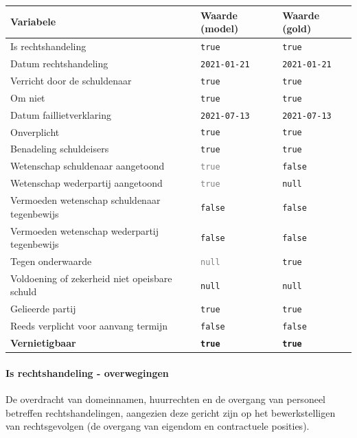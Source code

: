 \documentclass[
  dutch,
  a4paper,
]{article}
\begin{document}
\begin{center}
\small
\begin{tabular}{@{}p{7.4cm}p{2.6cm}p{2.6cm}@{}}
\toprule
Variabele & Waarde (model) & Waarde (gold) \\
\midrule
Is rechtshandeling & \texttt{true} & \texttt{true} \\
Datum rechtshandeling & \texttt{2021-01-21} & \texttt{2021-01-21} \\
Verricht door de schuldenaar & \texttt{true} & \texttt{true} \\
Om niet & \texttt{true} & \texttt{true} \\
Datum faillietverklaring & \texttt{2021-07-13} & \texttt{2021-07-13} \\
Onverplicht & \texttt{true} & \texttt{true} \\
Benadeling schuldeisers & \texttt{true} & \texttt{true} \\
Wetenschap schuldenaar aangetoond & \textcolor{gray}{\texttt{true}} & \texttt{false} \\
Wetenschap wederpartij aangetoond & \textcolor{gray}{\texttt{true}} & \texttt{null} \\
Vermoeden wetenschap schuldenaar tegenbewijs & \texttt{false} & \texttt{false} \\
Vermoeden wetenschap wederpartij tegenbewijs & \texttt{false} & \texttt{false} \\
Tegen onderwaarde & \textcolor{gray}{\texttt{null}} & \texttt{true} \\
Voldoening of zekerheid niet opeisbare schuld & \texttt{null} & \texttt{null} \\
Gelieerde partij & \texttt{true} & \texttt{true} \\
Reeds verplicht voor aanvang termijn & \texttt{false} & \texttt{false} \\
\textbf{Vernietigbaar} & \textbf{\texttt{true}} & \textbf{\texttt{true}} \\
\bottomrule
\end{tabular}
\end{center}

\paragraph{Is rechtshandeling - overwegingen}\label{is-rechtshandeling---overwegingen-26}

De overdracht van domeinnamen, huurrechten en de overgang van personeel betreffen rechtshandelingen, aangezien deze gericht zijn op het bewerkstelligen van rechtsgevolgen (de overgang van eigendom en contractuele posities).
\end{document}
